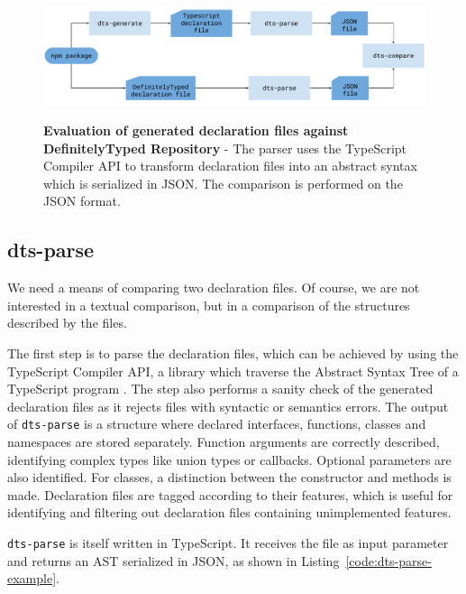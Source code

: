 \documentclass[english,cleveref,autoref,submission]{programming}
\newcommand{\coderef}[1]{Listing~\ref{#1}}
\begin{document}
\begin{figure}[tp]
    \begin{centering}
        {\includegraphics[width=1\textwidth]{evaluation-diagram.pdf}}
        \caption[Evaluation against DefinitelyTyped Repository]{\textbf{Evaluation of
            generated declaration files against DefinitelyTyped Repository} - The parser
          uses the TypeScript Compiler           API \cite{typescript-compiler-api} to
          transform declaration files into an abstract syntax which is serialized in
          JSON. The comparison is performed on the JSON format.} 
        \label{fig:evaluation-diagram}
    \end{centering}
\end{figure}

\subsection{dts-parse}
\label{sec:dts-parse}
We need a means of comparing two declaration files. Of
course, we are not interested in a textual comparison, but in a
comparison of the structures described by the files.

The first step is to parse the declaration files, which can be
achieved by using the TypeScript Compiler API, a library which traverse the
Abstract Syntax Tree of a TypeScript program
\cite{typescript-compiler-api}. 
The step also performs a sanity check of the generated declaration
files as it rejects files with syntactic or semantics errors.
The output of \texttt{dts-parse} is a structure where declared
{interfaces}, {functions}, {classes} and
{namespaces} are stored separately. Function arguments are
correctly described, identifying complex types like union types or
callbacks. Optional parameters are also identified. For
{classes}, a distinction between the constructor and methods
is made. Declaration files are tagged according to their features, which is useful for identifying and filtering out declaration files containing unimplemented features.

\texttt{dts-parse} is itself written in TypeScript. It receives the file as input
parameter and returns an AST serialized in JSON, as shown in \coderef{code:dts-parse-example}.
\end{document}
